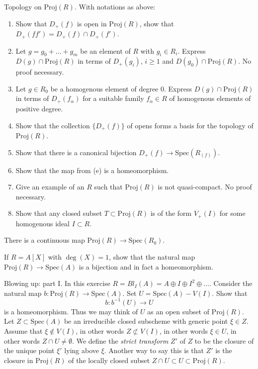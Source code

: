 \begin{exercise}
Topology on $\text{Proj}(R)$. With notations as above:
\begin{enumerate}
\item Show that $D_{+}(f)$ is open in $\text{Proj}(R)$, show that
$D_{+}(ff') = D_{+}(f) \cap D_{+}(f')$.
\item Let $g = g_0 + \ldots + g_m$ be an element
of $R$ with $g_i \in R_i$. Express $D(g) \cap \text{Proj}(R)$
in terms of $D_{+}(g_i)$, $i \geq 1$ and $D(g_0) \cap \text{Proj}(R)$.
No proof necessary.
\item Let $g\in R_0$ be a homogenous element of degree $0$.
Express $D(g) \cap \text{Proj}(R)$ in terms of $D_{+}(f_\alpha)$ for a suitable
family $f_\alpha \in R$ of homogenous elements of positive degree.
\item Show that the collection $\{D_{+}(f)\}$ of opens forms a
basis for the topology of $\text{Proj}(R)$.
\item Show that there is a canonical bijection
$D_{+}(f) \to \text{Spec}(R_{(f)})$.
\item Show that the map from (e) is a homeomorphism.
\item Give an example of an $R$ such that $\text{Proj}(R)$ is not
quasi-compact. No proof necessary.
\item Show that any closed subset $T \subset \text{Proj}(R)$ is of
the form $V_{+}(I)$ for some homogenous ideal $I \subset R$.
\end{enumerate}
\end{exercise}

\begin{remark}
There is a continuous map $ \text{Proj}(R) \longrightarrow \text{Spec}(R_0) $.
\end{remark}

\begin{exercise}
If $R=A[X]$ with $\deg(X)=1$, show that the natural map
$\text{Proj}(R) \to \text{Spec}(A)$ is a bijection and in fact
a homeomorphism.
\end{exercise}

\begin{exercise}
Blowing up: part I.
In this exercise $R = Bl_I(A) = A \oplus I \oplus I^2 \oplus \ldots$.
Consider the natural map $b : \text{Proj}(R) \to \text{Spec}(A)$. 
Set $U = \text{Spec}(A) - V(I)$. Show that
$$
b : b^{-1}(U) \longrightarrow U
$$
is a homeomorphism.
Thus we may think of $U$ as an open subset of $\text{Proj}(R)$.
Let $Z \subset \text{Spec}(A)$ be an irreducible closed subscheme
with generic point $\xi \in Z$. Assume that $\xi \not\in V(I)$,
in other words $Z \not\subset V(I)$, in other words
$\xi \in U$, in other words $Z\cap U \not=\emptyset$. We define
the {\it strict transform} $Z'$ of $Z$ to be the closure of the unique
point $\xi'$ lying above $\xi$. Another way to say this is that
$Z'$ is the closure in $\text{Proj}(R)$ of the locally closed subset
$Z\cap U \subset U \subset \text{Proj}(R)$.
\end{exercise}

